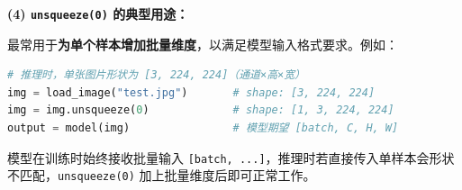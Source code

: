 \documentclass[a4paper,11pt]{ctexart}
\begin{document}
\begin{solutionbox}[参考答案与详细解析]
    \textbf{(4) \texttt{unsqueeze(0)} 的典型用途：}

    最常用于\textbf{为单个样本增加批量维度}，以满足模型输入格式要求。例如：
    \begin{lstlisting}[language=Python]
# 推理时，单张图片形状为 [3, 224, 224]（通道×高×宽）
img = load_image("test.jpg")       # shape: [3, 224, 224]
img = img.unsqueeze(0)             # shape: [1, 3, 224, 224]
output = model(img)                # 模型期望 [batch, C, H, W]
    \end{lstlisting}
    模型在训练时始终接收批量输入 \texttt{[batch, ...]}，推理时若直接传入单样本会形状不匹配，\texttt{unsqueeze(0)} 加上批量维度后即可正常工作。
\end{solutionbox}


\end{document}
